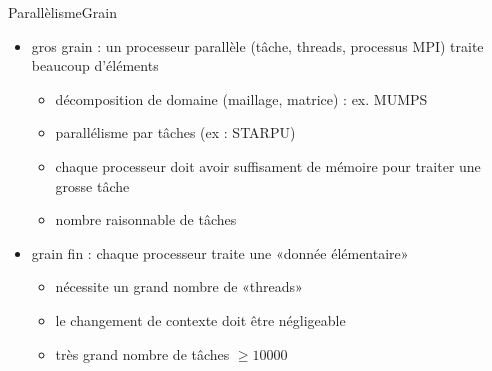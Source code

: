 \documentclass[11pt,mathserif]{beamer}
\newcommand{\hand}{\faHandORight}
\newcommand{\argi}{\faLightbulbO}
\begin{document}
\begin{frame}{Parallèlisme}{Grain}
\begin{itemize}[<+->]
  \item[\faTruck] gros grain : un processeur parallèle (tâche, threads, processus MPI) traite beaucoup d'éléments 
   \begin{itemize}
     \item décomposition de domaine (maillage, matrice) :  ex. MUMPS
     \item parallélisme par tâches (ex : STARPU)
     \item[\hand] chaque processeur doit avoir suffisament de mémoire pour traiter une grosse tâche
     \item[\argi] nombre raisonnable de tâches
   \end{itemize}
 \item[\faBicycle] grain fin : chaque processeur traite une «donnée élémentaire»
   \begin{itemize}
     \item[\hand] nécessite un grand nombre de «threads»
     \item[\hand] le changement de contexte doit être négligeable
     \item[\argi] très grand nombre de tâches $\geqslant 10000$
   \end{itemize}
\end{itemize}
\end{frame}
\end{document}
